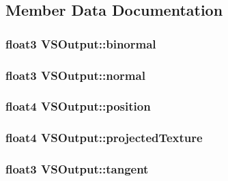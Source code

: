 \subsection{Member Data Documentation}
\hypertarget{struct_v_s_output_a5a39c9271837b0fe535541897d619fde}{
\subsubsection[{binormal}]{\setlength{\rightskip}{0pt plus 5cm}float3 {\bf VSOutput::binormal}}}
\label{struct_v_s_output_a5a39c9271837b0fe535541897d619fde}
\hypertarget{struct_v_s_output_a67a1540c109a358cb23fe13df347873f}{
\subsubsection[{normal}]{\setlength{\rightskip}{0pt plus 5cm}float3 {\bf VSOutput::normal}}}
\label{struct_v_s_output_a67a1540c109a358cb23fe13df347873f}
\hypertarget{struct_v_s_output_a045a78f2b66109778b98e52a787d2797}{
\subsubsection[{position}]{\setlength{\rightskip}{0pt plus 5cm}float4 {\bf VSOutput::position}}}
\label{struct_v_s_output_a045a78f2b66109778b98e52a787d2797}
\hypertarget{struct_v_s_output_a1f9794d3a0b3d5bf729a8cee2b710684}{
\subsubsection[{projectedTexture}]{\setlength{\rightskip}{0pt plus 5cm}float4 {\bf VSOutput::projectedTexture}}}
\label{struct_v_s_output_a1f9794d3a0b3d5bf729a8cee2b710684}
\hypertarget{struct_v_s_output_a645d68bb4487061a976c9de66d1350bb}{
\subsubsection[{tangent}]{\setlength{\rightskip}{0pt plus 5cm}float3 {\bf VSOutput::tangent}}}
\label{struct_v_s_output_a645d68bb4487061a976c9de66d1350bb}
